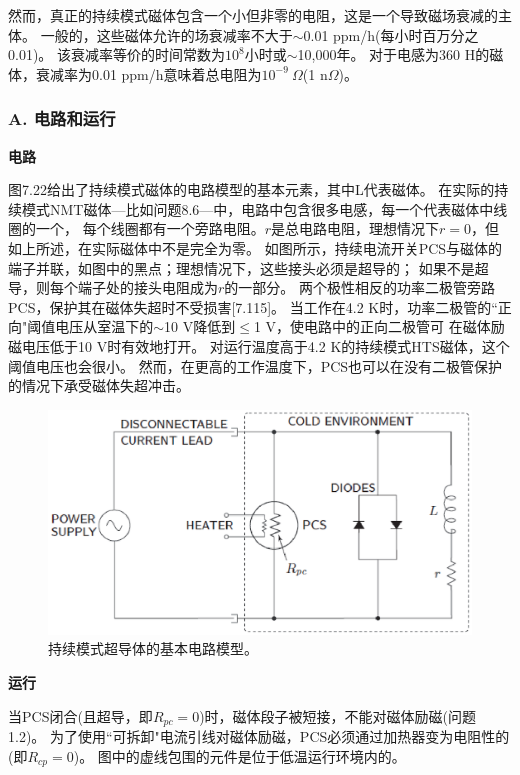 然而，真正的持续模式磁体包含一个小但非零的电阻，这是一个导致磁场衰减的主体。
一般的，这些磁体允许的场衰减率不大于$\sim$0.01 ppm/h(每小时百万分之0.01)。
该衰减率等价的时间常数为$10^8$小时或$\sim$10,000年。
 对于电感为360 H的磁体，衰减率为0.01 ppm/h意味着总电阻为$10^{-9}\ \Omega$(1 n$\Omega$)。
 
\subsubsection*{A. 电路和运行}
\textbf{电路}

图7.22给出了持续模式磁体的电路模型的基本元素，其中L代表磁体。
在实际的持续模式NMT磁体---比如问题8.6---中，电路中包含很多电感，每一个代表磁体中线圈的一个，
每个线圈都有一个旁路电阻。$r$是总电路电阻，理想情况下$r = 0$，但如上所述，在实际磁体中不是完全为零。
如图所示，持续电流开关PCS与磁体的端子并联，如图中的黑点；理想情况下，这些接头必须是超导的；
如果不是超导，则每个端子处的接头电阻成为$r$的一部分。
两个极性相反的功率二极管旁路PCS，保护其在磁体失超时不受损害[7.115]。
当工作在4.2 K时，功率二极管的``正向"阈值电压从室温下的$\sim$10 V降低到$\le$1 V，使电路中的正向二极管可
在磁体励磁电压低于10 V时有效地打开。
对运行温度高于4.2 K的持续模式HTS磁体，这个阈值电压也会很小。
然而，在更高的工作温度下，PCS也可以在没有二极管保护的情况下承受磁体失超冲击。

\begin{figure}[htbp]
	\centering
	\includegraphics[scale=0.6]{chpt7/figs/fig7.22.eps}
	\caption{持续模式超导体的基本电路模型。}
\end{figure}

\textbf{运行}

当PCS闭合(且超导，即$R_{pc} = 0$)时，磁体段子被短接，不能对磁体励磁(问题1.2)。
为了使用``可拆卸"电流引线对磁体励磁，PCS必须通过加热器变为电阻性的(即$R_{cp} = 0$)。
图中的虚线包围的元件是位于低温运行环境内的。

